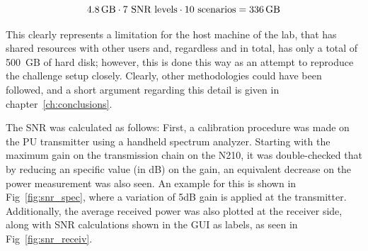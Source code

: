 \begin{equation}
    \SI{4.8}{\giga\byte} \cdot 7 \text{ SNR levels} \cdot 10 \text{ scenarios} = \SI{336}{\giga\byte}
\end{equation}

This clearly represents a limitation for the host machine of the lab, that has shared resources with other users and, regardless and in total, has only a total of \SI{500}{GB} of hard disk; however, this is done this way as an attempt to reproduce the challenge setup closely. Clearly, other methodologies could have been followed, and a short argument regarding this detail is given in chapter~\ref{ch:conclusions}.

The \ac{SNR} was calculated as follows: First, a calibration procedure was made on the \ac{PU} transmitter using a handheld spectrum analyzer. Starting with the maximum gain on the transmission chain on the N210, it was double-checked that by reducing an specific value (in dB) on the gain, an equivalent decrease on the power measurement was also seen. An example for this is shown in Fig~\ref{fig:snr_spec}, where a variation of 5dB gain is applied at the transmitter. Additionally, the average received power was also plotted at the receiver side, along with SNR calculations shown in the GUI as labels, as seen in Fig~\ref{fig:snr_receiv}.

